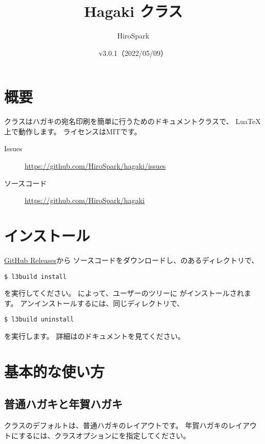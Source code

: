 \documentclass{hagaki-doc}
\title{Hagaki クラス}
\author{HiroSpark}
\date{v3.0.1（2022/05/09）}
\begin{document}
\maketitle

\section{概要}

クラスはハガキの宛名印刷を簡単に行うためのドキュメントクラスで、
Lua\TeX{}上で動作します。
ライセンスはMITです。

\begin{description}
  \item[Issues] \url{https://github.com/HiroSpark/hagaki/issues}
  \item[ソースコード] \url{https://github.com/HiroSpark/hagaki}
\end{description}

\section{インストール}

\href{https://github.com/HiroSpark/hagaki/releases/}{GitHub Releases}から
ソースコードをダウンロードし、のあるディレクトリで、

\begin{lstlisting}
$ l3build install
\end{lstlisting}

を実行してください。
によって、ユーザーのツリーに
がインストールされます。
アンインストールするには、同じディレクトリで、

\begin{lstlisting}
$ l3build uninstall
\end{lstlisting}

を実行します。
詳細はのドキュメントを見てください。

\section{基本的な使い方}

\subsection{普通ハガキと年賀ハガキ}

クラスのデフォルトは、普通ハガキのレイアウトです。
年賀ハガキのレイアウトにするには、クラスオプションにを指定してください。
\end{document}
